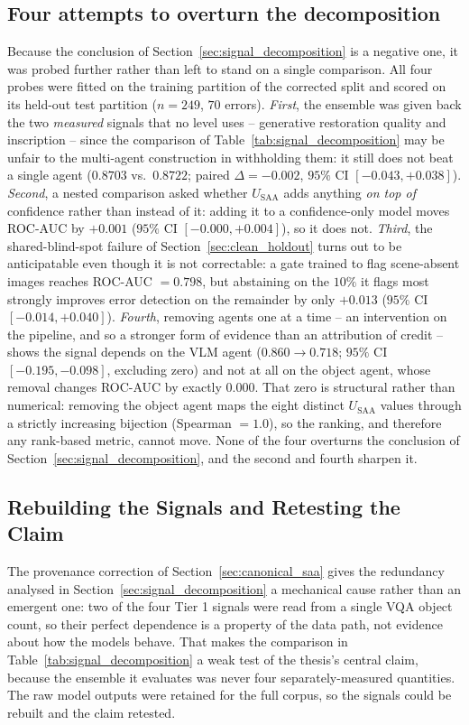 \documentclass[12pt,a4paper]{report}
\begin{document}
\subsection{Four attempts to overturn the decomposition}
\label{sec:moved_four}
Because the conclusion of Section~\ref{sec:signal_decomposition} is a negative one, it was probed further rather than left to stand on a single comparison. All four probes were fitted on the training partition of the corrected split and scored on its held-out test partition ($n=249$, $70$ errors). \emph{First}, the ensemble was given back the two \emph{measured} signals that no level uses -- generative restoration quality and inscription -- since the comparison of Table~\ref{tab:signal_decomposition} may be unfair to the multi-agent construction in withholding them: it still does not beat a single agent ($0.8703$ vs.\ $0.8722$; paired $\Delta = -0.002$, $95\%$ CI $[-0.043, +0.038]$). \emph{Second}, a nested comparison asked whether $U_{\text{SAA}}$ adds anything \emph{on top of} confidence rather than instead of it: adding it to a confidence-only model moves ROC-AUC by $+0.001$ ($95\%$ CI $[-0.000, +0.004]$), so it does not. \emph{Third}, the shared-blind-spot failure of Section~\ref{sec:clean_holdout} turns out to be anticipatable even though it is not correctable: a gate trained to flag scene-absent images reaches ROC-AUC $=0.798$, but abstaining on the $10\%$ it flags most strongly improves error detection on the remainder by only $+0.013$ ($95\%$ CI $[-0.014, +0.040]$). \emph{Fourth}, removing agents one at a time -- an intervention on the pipeline, and so a stronger form of evidence than an attribution of credit -- shows the signal depends on the VLM agent ($0.860 \to 0.718$; $95\%$ CI $[-0.195, -0.098]$, excluding zero) and not at all on the object agent, whose removal changes ROC-AUC by exactly $0.000$. That zero is structural rather than numerical: removing the object agent maps the eight distinct $U_{\text{SAA}}$ values through a strictly increasing bijection (Spearman $=1.0$), so the ranking, and therefore any rank-based metric, cannot move. None of the four overturns the conclusion of Section~\ref{sec:signal_decomposition}, and the second and fourth sharpen it.

\subsection{Rebuilding the Signals and Retesting the Claim}
\label{sec:signal_rebuild}
The provenance correction of Section~\ref{sec:canonical_saa} gives the redundancy analysed in Section~\ref{sec:signal_decomposition} a mechanical cause rather than an emergent one: two of the four Tier 1 signals were read from a single VQA object count, so their perfect dependence is a property of the data path, not evidence about how the models behave. That makes the comparison in Table~\ref{tab:signal_decomposition} a weak test of the thesis's central claim, because the ensemble it evaluates was never four separately-measured quantities. The raw model outputs were retained for the full corpus, so the signals could be rebuilt and the claim retested.
\end{document}

